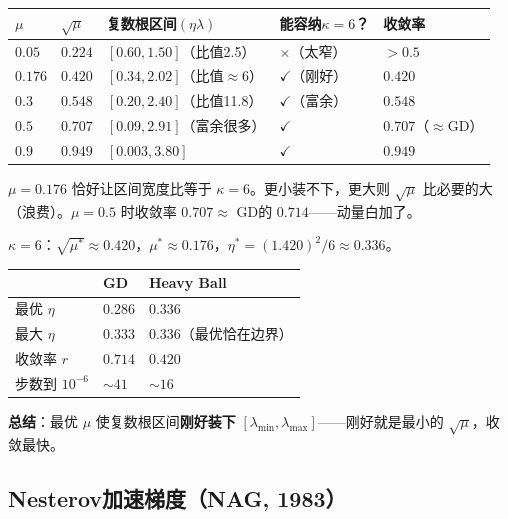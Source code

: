 \documentclass[12pt,a4paper]{article}
\begin{document}
\begin{center}\small
\begin{longtable}{|l|l|l|l|l|}
\hline
$\mu$ & $\sqrt\mu$ & 复数根区间$(\eta\lambda)$ & 能容纳$\kappa=6$？ & 收敛率 \\
\hline
$0.05$ & $0.224$ & $[0.60, 1.50]$（比值2.5） & $\times$（太窄） & $>0.5$  \\
$\mathbf{0.176}$ & $\mathbf{0.420}$ & $[0.34, 2.02]$（比值$\approx 6$） & $\checkmark$（刚好） & $\mathbf{0.420}$  \\
$0.3$ & $0.548$ & $[0.20, 2.40]$（比值11.8） & $\checkmark$（富余） & $0.548$  \\
$0.5$ & $0.707$ & $[0.09, 2.91]$（富余很多） & $\checkmark$ & $0.707$（$\approx$GD）\\
$0.9$ & $0.949$ & $[0.003, 3.80]$ & $\checkmark$ & $0.949$  \\
\hline
\end{longtable}
\end{center}

$\mu = 0.176$ 恰好让区间宽度比等于 $\kappa = 6$。更小装不下，更大则 $\sqrt\mu$ 比必要的大（浪费）。$\mu = 0.5$ 时收敛率 $0.707 \approx$ GD的 $0.714$——动量白加了。

$\kappa = 6$：$\sqrt{\mu^*} \approx 0.420$，$\mu^* \approx 0.176$，$\eta^* = (1.420)^2/6 \approx 0.336$。







\begin{center}\small
\begin{longtable}{|l|l|l|}
\hline
 & GD & Heavy Ball \\
\hline
最优 $\eta$ & $0.286$ & $0.336$ \\
最大 $\eta$ & $0.333$ & $0.336$（最优恰在边界） \\
收敛率 $r$ & $0.714$ & $0.420$ \\
步数到 $10^{-6}$ & $\sim 41$ & $\sim 16$ \\
\hline
\end{longtable}
\end{center}


\textbf{总结}：最优 $\mu$ 使复数根区间\textbf{刚好装下} $[\lambda_{\min}, \lambda_{\max}]$——刚好就是最小的 $\sqrt\mu$，收敛最快。


\subsection{Nesterov加速梯度（NAG, 1983）}
\end{document}
